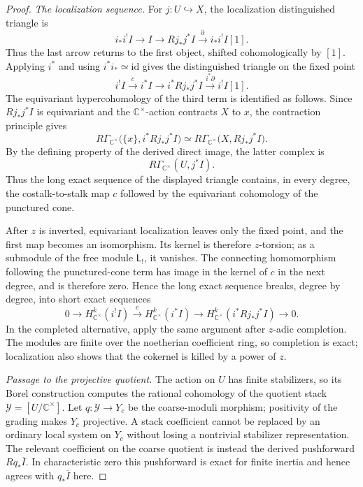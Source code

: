 \documentclass[10pt,a4paper]{amsart}
\begin{document}
\begin{proof}
\smallskip
\noindent\emph{The localization sequence.}
For $j:U\hookrightarrow X$, the localization distinguished triangle is
\[
 i_*i^!I\longrightarrow I
 \longrightarrow Rj_*j^*I
 \xrightarrow{\partial}i_*i^!I[1].
\]
Thus the last arrow returns to the first object, shifted cohomologically by
$[1]$.  Applying $i^*$ and using $i^*i_*\simeq\mathrm{id}$ gives the
distinguished triangle on the fixed point
\[
 i^!I\xrightarrow{c}i^*I\longrightarrow i^*Rj_*j^*I
 \xrightarrow{i^*\partial}i^!I[1].
\]
The equivariant hypercohomology of the third term is identified as follows.  Since
$Rj_*j^*I$ is equivariant and the $\mathbb C^\times$-action contracts $X$ to
$x$, the contraction principle gives
\[
 R\Gamma_{\mathbb C^\times}
   \bigl(\{x\},i^*Rj_*j^*I\bigr)
 \simeq
 R\Gamma_{\mathbb C^\times}
   \bigl(X,Rj_*j^*I\bigr).
\]
By the defining property of the derived direct image, the latter complex is
\[
 R\Gamma_{\mathbb C^\times}(U,j^*I).
\]
Thus the long exact sequence of the displayed triangle contains, in every
degree, the costalk-to-stalk map $c$ followed by the equivariant cohomology
of the punctured cone.

After $z$ is inverted, equivariant localization
\cite[Theorem~6.2(2)]{GKM} leaves only the fixed
point, and the first map becomes an
isomorphism.  Its kernel is therefore $z$-torsion; as a submodule of the free
module $\mathsf L_!$, it vanishes.  The connecting homomorphism following the
punctured-cone term has image in the kernel of $c$ in the next degree, and is
therefore zero.  Hence the long exact sequence breaks, degree by degree, into
short exact sequences
\[
 0\longrightarrow H^k_{\mathbb C^\times}(i^!I)
 \xrightarrow{c}H^k_{\mathbb C^\times}(i^*I)
 \longrightarrow H^k_{\mathbb C^\times}(i^*Rj_*j^*I)
 \longrightarrow0.
\]
In the completed alternative, apply the same argument after $z$-adic
completion.  The modules are finite over the noetherian coefficient ring, so
completion is exact; localization also shows that the cokernel is killed by
a power of $z$.

\smallskip
\noindent\emph{Passage to the projective quotient.}
The action on $U$ has finite stabilizers, so its Borel construction computes
the rational cohomology of the quotient stack
$\mathcal Y=[U/\mathbb C^\times]$.  Let
$q:\mathcal Y\to Y_c$ be the coarse-moduli morphism; positivity of the
grading makes $Y_c$ projective.  A stack coefficient cannot be replaced by an
ordinary local system on $Y_c$ without losing a nontrivial stabilizer
representation.  The relevant coefficient on the coarse quotient is instead
the derived pushforward $Rq_*\overline I$.  In characteristic zero this pushforward is
exact for finite inertia and hence agrees with $q_*\overline I$ here.


\end{proof}
\end{document}
